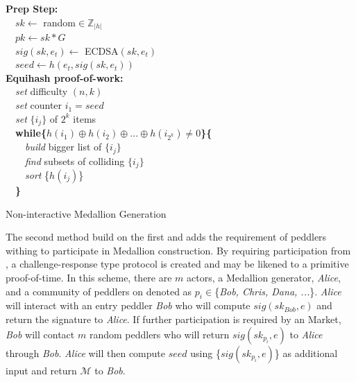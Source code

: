 \begin{algorithm}[H]


   \textbf{Prep Step:}\\
    ~~$sk\gets$ random$\in \mathbb{Z}_{|h|}$\\
    ~~$pk\gets sk*G$\\
    ~~$sig(sk,e_t)\gets$ ECDSA$(sk,e_t)$\\
    ~~$seed\gets h(e_t, sig(sk,e_t))$ \\
   \textbf{Equihash proof-of-work:}\\
    ~~\textit{set} difficulty $(n,k)$\\
    ~~\textit{set} counter $i_1 = seed$\\
    ~~\textit{set} $\{i_j\}$ of $2^k$ items\\
    ~~\textbf{while\{}$h(i_1) \oplus h(i_2) \oplus ...\oplus h(i_{2^k}) \neq 0$\textbf{\}\{}\\
     ~~~~\textit{build} bigger list of $\{i_j\}$\\
     ~~~~\textit{find} subsets of colliding $\{i_j\}$\\
     ~~~~\textit{sort} \{$h(i_j)$\}\\
    ~~\textbf{\}}\\
    
   \caption{Non-interactive Medallion Generation}
\end{algorithm}


The second method build on the first and adds the requirement of peddlers withing \tOM{} to participate in Medallion construction. By requiring participation from \tOM{}, a challenge-response type protocol is created and may be likened to a primitive proof-of-time.
In this scheme, there are $m$ actors, a Medallion generator, \textit{Alice}, and a community of peddlers on \tOM{} denoted as $p_i \in$\{\textit{Bob, Chris, Dana, ...}\}. \textit{Alice} will interact with an entry peddler \textit{Bob} who will compute $sig(sk_{Bob}, e)$ and return the signature to \textit{Alice}. If further participation is required by an \Orchid{} Market, \textit{Bob} will contact $m$ random peddlers who will return $sig(sk_{p_i}, e)$ to \textit{Alice} through  \textit{Bob}. \textit{Alice} will then compute $seed$ using \{$sig(sk_{p_i}, e)$\} as additional input and return $\mathcal{M}$ to \textit{Bob}. 

